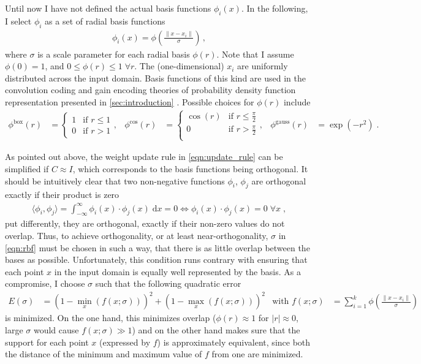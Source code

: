 \documentclass[a4paper,11pt]{article}
\begin{document}
Until now I have not defined the actual basis functions $\phi_i(x)$. In the following, I select $\phi_i$ as a set of radial basis functions \cite{press2007numerical}
\begin{align}
	\phi_i(x) = \phi\left(\frac{\| x - x_i \|}{\sigma}\right) \,,
	\label{eqn:rbf}
\end{align}
where $\sigma$ is a scale parameter for each radial basis $\phi(r)$. Note that I assume $\phi(0) = 1$, and $0 \leq \phi(r) \leq 1 \; \forall r$. The (one-dimensional) $x_i$ are uniformly distributed across the input domain. Basis functions of this kind are used in the convolution coding and gain encoding theories of probability density function representation presented in \cref{sec:introduction} \cite{knill2004bayesian,ma2006bayesian}. Possible choices for $\phi(r)$ include
\begin{align}
	  \phi^\mathrm{box}(r) &= \begin{cases}
				1 & \text{if } r \leq 1 \\
				0 & \text{if } r > 1
	           \end{cases},
	& \phi^\mathrm{cos}(r) &= \begin{cases}
	              \cos(r) & \text{if } r \leq \frac{\pi}2 \\
	              0       & \text{if } r > \frac{\pi}2 \\
	             \end{cases},
	& \phi^\mathrm{gauss}(r) &= \exp\left(-r^2\right) \;.
	\label{eqn:basis}
\end{align}

As pointed out above, the weight update rule in \cref{eqn:update_rule} can be simplified if $C \approx I$, which corresponds to the basis functions being orthogonal. It should be intuitively clear that two non-negative functions $\phi_i$, $\phi_j$ are orthogonal exactly if their product is zero
\begin{align}
	\langle \phi_i, \phi_j \rangle = \int_{-\infty}^\infty \phi_i(x) \cdot \phi_j(x) \;\mathrm{d}x = 0 \Leftrightarrow \phi_i(x) \cdot \phi_j(x) = 0 \;\forall x \;,
\end{align}
put differently, they are orthogonal, exactly if their non-zero values do not overlap. Thus, to achieve orthogonality, or at least near-orthogonality, $\sigma$ in \cref{eqn:rbf} must be chosen in such a way, that there is as little overlap between the bases as possible. Unfortunately, this condition runs contrary with ensuring that each point $x$ in the input domain is equally well represented by the basis. As a compromise, I choose $\sigma$ such that the following quadratic error
\begin{align}
	  E(\sigma) &= \left(1 - \min_x(f(x; \sigma))\right)^2 + \left(1 - \max_x(f(x; \sigma))\right)^2
	& \text{with } f(x; \sigma) &= \sum_{i = 1}^k \phi\left(\frac{\| x - x_i \|}{\sigma}\right)
\end{align}
is minimized. On the one hand, this minimizes overlap ($\phi(r) \approx 1$ for $|r| \approx 0$, large $\sigma$ would cause $f(x; \sigma) \gg 1$) and on the other hand makes sure that the support for each point $x$ (expressed by $f$) is approximately equivalent, since both the distance of the minimum and maximum value of $f$ from one are minimized.
\end{document}
